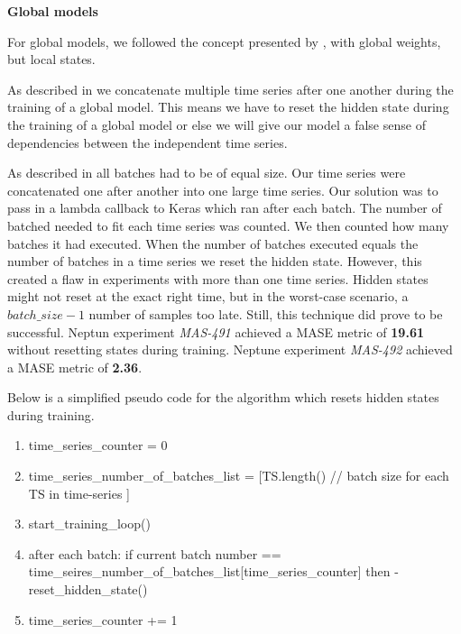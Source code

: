 \textbf{Global models}

For global models, we followed the concept presented by \cite{Smyl2020},
with global weights, but local states.

As described in 
we concatenate multiple time series after one another during the training of a global model.
This means we have to reset the hidden state during the training of a global model
or else we will give our model a false sense of dependencies between
the independent time series.

As described in  all
batches had to be of equal size. Our time series were concatenated one after
another into one large time series.
Our solution was to pass in a lambda callback to Keras which ran after each batch.
The number of batched needed to fit each time series was counted.
We then counted how many batches it had executed.
When the number of batches executed equals the number of batches in a time series we reset the hidden state.
However, this created a flaw in experiments with more than one time series.
Hidden states might not reset at the exact
right time, but in the worst-case scenario, a $batch\_size - 1$ number of
samples too late.
Still, this technique did prove to be successful.
Neptun experiment \textit{MAS-491} achieved a MASE metric of \textbf{19.61}
without resetting states during training.
Neptune experiment \textit{MAS-492} achieved a MASE metric of \textbf{2.36}.

Below is a simplified pseudo code for the algorithm which resets hidden states
during training.
\begin{enumerate}
  \item time\_series\_counter = 0
  \item time\_series\_number\_of\_batches\_list = [TS.length() // batch size for each TS in time-series ]
  \item start\_training\_loop()
  \item after each batch: if current batch number ==
        time\_seires\_number\_of\_batches\_list[time\_series\_counter]
        then -\> reset\_hidden\_state()
  \item time\_series\_counter += 1
\end{enumerate}







